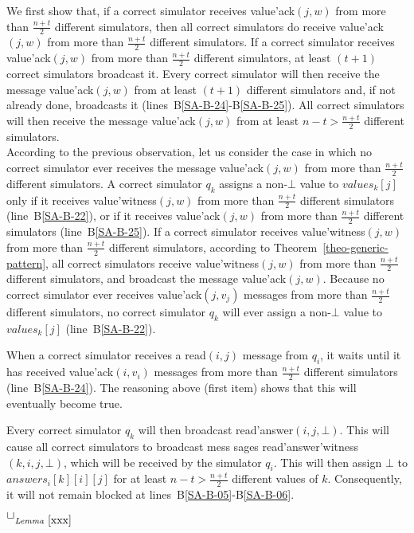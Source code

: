 \documentclass[11pt,letterpaper]{article}
\newlength {\afterproof}
\newcommand{\toto}{xxx}
\newenvironment{proofL}{\noindent{\bf Proof }}
{\hspace*{\fill}$\Box_{\mathit{Lemma}~\ref{\toto}}$\par\vspace{\afterproof}}
\begin{document}
\begin{proofL}
\begin{itemize}
We  first show that, if a correct simulator receives
{\sc value'ack}$(j,w)$ from more than $\frac{n+t}{2}$ different simulators,
then all correct simulators do receive {\sc value'ack}$(j,w)$ from more
than $\frac{n+t}{2}$ different simulators.
If a correct simulator receives
{\sc value'ack}$(j,w)$ from more than $\frac{n+t}{2}$ different simulators,
at least $(t+1)$ correct simulators broadcast it.
Every correct simulator will then receive the message {\sc value'ack}$(j,w)$
from at least $(t+1)$ different simulators and, if not already done,
 broadcasts it (lines~B\ref{SA-B-24}-B\ref{SA-B-25}).
All correct simulators will then receive the message {\sc value'ack}$(j,w)$
from at least $n-t>\frac{n+t}{2}$ different simulators.\\


According to the previous observation, let us
consider the case in which no correct simulator ever receives  the message
{\sc value'ack}$(j,w)$  from more than $\frac{n+t}{2}$different simulators.
A correct simulator $q_k$ assigns a non-$\bot$ value to $values_k[j]$ only
if  it receives {\sc value'witness}$(j,w)$ from more than
$\frac{n+t}{2}$ different simulators (line~B\ref{SA-B-22}), or if it receives
{\sc value'ack}$(j,w)$ from more than $\frac{n+t}{2}$ different simulators
(line~B\ref{SA-B-25}). If a correct simulator receives
{\sc value'witness}$(j,w)$ from more than $\frac{n+t}{2}$ different
simulators, according to Theorem~\ref{theo-generic-pattern}, all correct
simulators  receive {\sc value'witness}$(j,w)$ from more than
$\frac{n+t}{2}$ different simulators, and  broadcast
the message {\sc value'ack}$(j,w)$.
Because no correct simulator ever receives {\sc value'ack}$(j,v_j)$ messages
from more than $\frac{n+t}{2}$ different simulators, no correct simulator $q_k$
will ever assign a non-$\bot$ value to $values_k[j]$ (line~B\ref{SA-B-22}).

When a correct simulator receives a {\sc read}$(i,j)$ message from $q_i$, it
waits until it has received {\sc value'ack}$(i,v_i)$ messages
from more than $\frac{n+t}{2}$ different simulators (line~B\ref{SA-B-24}).
The reasoning above (first item)
shows that this will eventually become true.

Every correct simulator $q_k$ will then broadcast
{\sc read'answer}$(i,j,\bot)$. This will cause all correct simulators to
broadcast mess sages {\sc read'answer'witness}$(k,i,j,\bot)$,
which will be received by  the simulator $q_i$. This
will then assign $\bot$ to $answers_i[k][i][j]$ for
at least $n-t > \frac{n+t}{2}$ different values of $k$.
Consequently, it  will not remain blocked at
lines~B\ref{SA-B-05}-B\ref{SA-B-06}.


\end{itemize}
\end{proofL}
\end{document}
